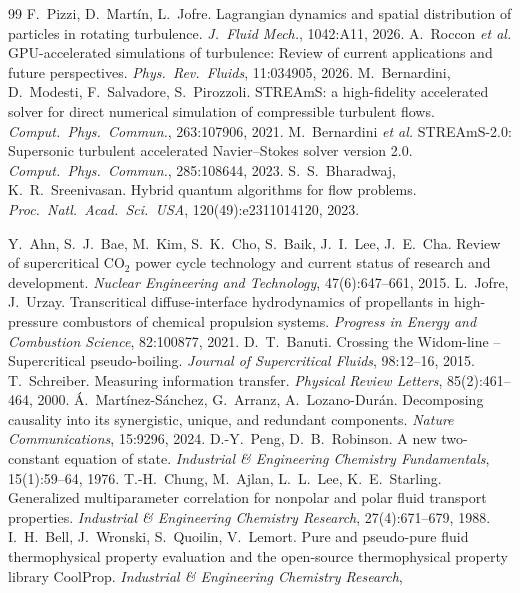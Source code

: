 \documentclass[11pt]{article}
\begin{document}
\begin{thebibliography}{99}
 F.\ Pizzi, D.\ Mart\'in, L.\ Jofre. Lagrangian dynamics and spatial distribution of particles in rotating turbulence. \emph{J.\ Fluid Mech.}, 1042:A11, 2026.
 A.\ Roccon \emph{et al.} GPU-accelerated simulations of turbulence: Review of current applications and future perspectives. \emph{Phys.\ Rev.\ Fluids}, 11:034905, 2026.
 M.\ Bernardini, D.\ Modesti, F.\ Salvadore, S.\ Pirozzoli. STREAmS: a high-fidelity accelerated solver for direct numerical simulation of compressible turbulent flows. \emph{Comput.\ Phys.\ Commun.}, 263:107906, 2021.
 M.\ Bernardini \emph{et al.} STREAmS-2.0: Supersonic turbulent accelerated Navier--Stokes solver version 2.0. \emph{Comput.\ Phys.\ Commun.}, 285:108644, 2023.
 S.\ S.\ Bharadwaj, K.\ R.\ Sreenivasan. Hybrid quantum algorithms for flow problems. \emph{Proc.\ Natl.\ Acad.\ Sci.\ USA}, 120(49):e2311014120, 2023.
 Y.\ Ahn, S.\ J.\ Bae, M.\ Kim, S.\ K.\ Cho, S.\ Baik, J.\ I.\ Lee, J.\ E.\ Cha.
Review of supercritical CO$_2$ power cycle technology and current status of research and
development. \emph{Nuclear Engineering and Technology}, 47(6):647--661, 2015.
 L.\ Jofre, J.\ Urzay. Transcritical diffuse-interface hydrodynamics
of propellants in high-pressure combustors of chemical propulsion systems. \emph{Progress
in Energy and Combustion Science}, 82:100877, 2021.
 D.\ T.\ Banuti. Crossing the Widom-line -- Supercritical pseudo-boiling.
\emph{Journal of Supercritical Fluids}, 98:12--16, 2015.
 T.\ Schreiber. Measuring information transfer. \emph{Physical Review
Letters}, 85(2):461--464, 2000.
 \'A.\ Mart\'inez-S\'anchez, G.\ Arranz, A.\ Lozano-Dur\'an.
Decomposing causality into its synergistic, unique, and redundant components. \emph{Nature
Communications}, 15:9296, 2024.
 D.-Y.\ Peng, D.\ B.\ Robinson. A new two-constant equation of
state. \emph{Industrial \& Engineering Chemistry Fundamentals}, 15(1):59--64, 1976.
 T.-H.\ Chung, M.\ Ajlan, L.\ L.\ Lee, K.\ E.\ Starling. Generalized
multiparameter correlation for nonpolar and polar fluid transport properties.
\emph{Industrial \& Engineering Chemistry Research}, 27(4):671--679, 1988.
 I.\ H.\ Bell, J.\ Wronski, S.\ Quoilin, V.\ Lemort. Pure and
pseudo-pure fluid thermophysical property evaluation and the open-source thermophysical
property library CoolProp. \emph{Industrial \& Engineering Chemistry Research},

\end{thebibliography}
\end{document}
